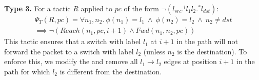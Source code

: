 \noindent\textbf{Type 3.} For a tactic $R$ applied to $pc$ 
of the form $\neg (l_{src}  .^i l_1 l_2 .^* l_{dst})$: 
\begin{multline} \label{eq:t3}
\Psi_T(R,pc) = \forall n_1, n_2.~\phi(n_1) = l_1~\wedge~ \phi(n_2) = l_2 ~\wedge~ n_2 \not=dst \\  \implies 
\neg (Reach(n_1, pc, i + 1) \wedge Fwd(n_1, n_2, pc))
\end{multline}
This tactic ensures that a switch with label $l_1$ at $i+1$ in the path
will not forward the packet to a switch with label $l_2$ (unless $n_2$ is the destination). 
To enforce this, we modify the  and remove all $l_1\rightarrow l_2$
edges at position $i+1$ in the path for which $l_2$ is different from the destination.  


